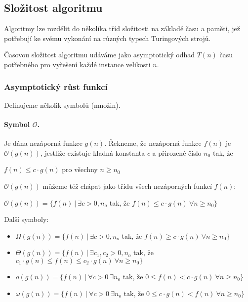 \subsection*{Složitost algoritmu}
Algoritmy lze rozdělit do několika tříd složitosti na základě času a paměti, jež potřebují ke svému vykonání na různých typech Turingových strojů. \cite{algoritmy:slozitosti}

Časovou složitost algoritmu udáváme jako asymptotický odhad $T(n)$ času potřebného pro vyřešení každé instance velikosti $n$.

\subsubsection*{Asymptotický růst funkcí} Definujeme několik symbolů (množin).

\paragraph{Symbol $\mathcal{O}$.} Je dána nezáporná funkce $g(n)$. Řekneme, že nezáporná funkce $f(n)$ je $\mathcal{O}(g(n))$, jestliže existuje kladná konstanta $c$ a přirozené číslo $n_0$ tak, že

\begin{center}
    $f(n) \leq c \cdot g(n)$ pro všechny $n \geq n_0$
\end{center}

$\mathcal{O}(g(n))$ můžeme též chápat jako třídu všech nezáporných funkcí $f(n)$:

\begin{center}
    $\mathcal{O}(g(n)) = \{ f(n)~|~\exists c > 0, n_o$ tak, že $f(n) \leq c \cdot g(n) ~ \forall n \geq n_0\}$
\end{center}
\noindent Další symboly:
\begin{itemize}[itemsep=0pt]
    \item $\Omega(g(n)) = \{ f(n)~|~\exists c > 0 ,n_o$ tak, že $f(n) \geq c \cdot g(n) ~ \forall n \geq n_0\}$
    \item $\Theta(g(n)) = \{ f(n)~|~\exists c_1,c_2 > 0 ,n_o$ tak, že $c_1 \cdot g(n) \leq f(n) \leq c_2 \cdot g(n) ~ \forall n \geq n_0\}$
    \item $o(g(n)) = \{ f(n)~|~\forall c > 0 ~\exists n_o$ tak, že $ 0 \leq f(n) < c \cdot g(n) ~ \forall n \geq n_0\}$
    \item $\omega(g(n)) = \{ f(n)~|~\forall c > 0 ~\exists n_o$ tak, že $ 0 \leq c \cdot g(n) < f(n) ~ \forall n \geq n_0\}$
\end{itemize}

